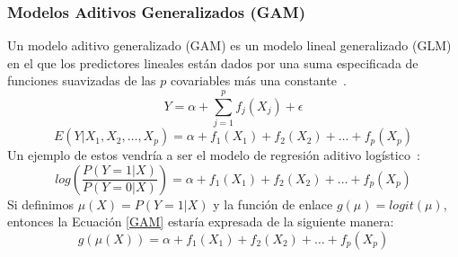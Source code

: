 \subsubsection{Modelos Aditivos Generalizados (GAM)}
Un modelo aditivo generalizado (GAM) es un modelo lineal generalizado (GLM) en el que los predictores lineales están dados por una suma especificada de funciones suavizadas de las $p$ covariables más una constante~\cite{mgcv}.
\begin{equation}
    Y=\alpha+ \sum^p_{j=1}  f_j(X_j) + \epsilon 
\end{equation}
\begin{equation}
    E(Y|X_1,X_2,\dots,X_p)=\alpha+f_1(X_1)+f_2(X_2)+\dots+f_p(X_p)
\end{equation}
Un ejemplo de estos vendría a ser el modelo de regresión aditivo logístico~\cite{friedman2001elements}:
\begin{equation}\label{GAM}
    log\left(\frac{P(Y=1|X)}{P(Y=0|X)}\right)=\alpha+f_1(X_1)+f_2(X_2)+\dots+f_p(X_p)
\end{equation}
Si definimos $\mu(X)=P(Y=1|X)$ y la función de enlace $g(\mu)=logit(\mu)$, entonces la Ecuación \ref{GAM} estaría expresada de la siguiente manera:
\begin{equation}
    g(\mu(X))=\alpha+f_1(X_1)+f_2(X_2)+\dots+f_p(X_p)
\end{equation}

